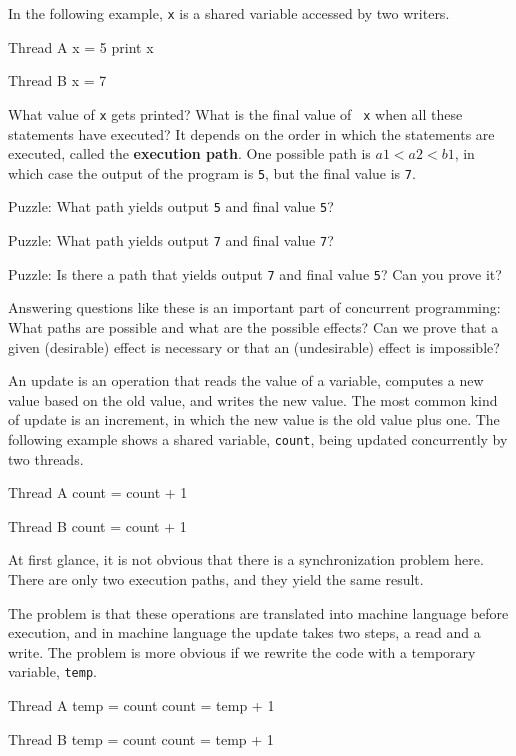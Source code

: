 
In the following example, {\tt x} is a shared variable accessed
by two writers.

\begin{lsthalfbox}[before skip=0.6em]{Thread A}
x = 5
print x
\end{lsthalfbox}
\begin{lsthalfbox}[after skip=0.6em]{Thread B}
x = 7
\end{lsthalfbox}

What value of {\tt x} gets printed?  What is the final value of {\tt
x} when all these statements have executed?  It depends on the order
in which the statements are executed, called the {\bf execution path}.
One possible path is $a1 < a2 < b1$, in which case the output of the
program is {\tt 5}, but the final value is {\tt 7}.

Puzzle: What path yields output {\tt 5} and final
value {\tt 5}?

Puzzle: What path yields output {\tt 7} and final
value {\tt 7}?

Puzzle: Is there a path that yields output {\tt 7} and final
value {\tt 5}?  Can you prove it?

Answering questions like these is an important part of concurrent
programming:  What paths are possible and what are the
possible effects?  Can we prove that a given (desirable) effect is
necessary or that an (undesirable) effect is impossible?



An update is an operation that reads the value of a variable, computes
a new value based on the old value, and writes the new value.
The most common kind of update is an increment, in which the
new value is the old value plus one.  The following example
shows a shared variable, {\tt count}, being updated concurrently
by two threads.
\begin{lsthalfbox}[before skip=0.6em]{Thread A}
count = count + 1
\end{lsthalfbox}
\begin{lsthalfbox}[after skip=0.6em]{Thread B}
count = count + 1
\end{lsthalfbox}

At first glance, it is not obvious that there is a synchronization
problem here.  There are only two execution paths, and they
yield the same result.

The problem is that these operations are translated into
machine language before execution, and in machine language
the update takes two steps, a read and a write.
The problem is more obvious if we rewrite the code with a temporary
variable, {\tt temp}.
\begin{lsthalfbox}[before skip=0.6em]{Thread A}
temp = count
count = temp + 1
\end{lsthalfbox}
\begin{lsthalfbox}[after skip=0.6em]{Thread B}
temp = count
count = temp + 1
\end{lsthalfbox}

